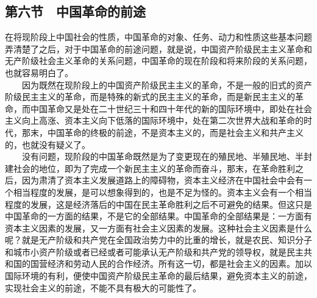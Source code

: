 \documentclass[cn,11pt,chinese]{elegantbook}
\def\myformat#1{\hfil\hfil #1}
\begin{document}
\subsection*{\myformat{第六节　中国革命的前途}}
在将现阶段上中国社会的性质，中国革命的对象、任务、动力和性质这些基本问题弄清楚了之后，对于中国革命的前途问题，就是说，中国资产阶级民主主义革命和无产阶级社会主义革命的关系问题，中国革命的现在阶段和将来阶段的关系问题，也就容易明白了。\\
　　因为既然在现阶段上的中国资产阶级民主主义的革命，不是一般的旧式的资产阶级民主主义的革命，而是特殊的新式的民主主义的革命，而是新民主主义的革命，而中国革命又是处在二十世纪三十和四十年代的新的国际环境中，即处在社会主义向上高涨、资本主义向下低落的国际环境中，处在第二次世界大战和革命的时代，那末，中国革命的终极的前途，不是资本主义的，而是社会主义和共产主义的，也就没有疑义了。\\
　　没有问题，现阶段的中国革命既然是为了变更现在的殖民地、半殖民地、半封建社会的地位，即为了完成一个新民主主义的革命而奋斗，那末，在革命胜利之后，因为肃清了资本主义发展道路上的障碍物，资本主义经济在中国社会中会有一个相当程度的发展，是可以想象得到的，也是不足为怪的。资本主义会有一个相当程度的发展，这是经济落后的中国在民主革命胜利之后不可避免的结果。但这只是中国革命的一方面的结果，不是它的全部结果。中国革命的全部结果是：一方面有资本主义因素的发展，又一方面有社会主义因素的发展。这种社会主义因素是什么呢？就是无产阶级和共产党在全国政治势力中的比重的增长，就是农民、知识分子和城市小资产阶级或者已经或者可能承认无产阶级和共产党的领导权，就是民主共和国的国营经济和劳动人民的合作经济。所有这一切，都是社会主义的因素。加以国际环境的有利，便使中国资产阶级民主革命的最后结果，避免资本主义的前途，实现社会主义的前途，不能不具有极大的可能性了。\\
\end{document}
